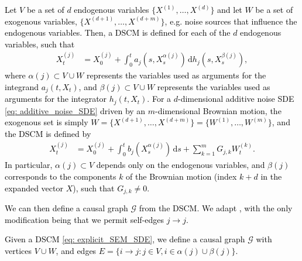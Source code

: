 \documentclass[twoside,11pt]{article}
\newcommand{\rv}[1]{\textcolor{black}{#1}}
\begin{document}
\rv{\begin{definition}[DSCM]
Let $V$ be a set of $d$ endogenous variables $\{ X^{(1)}, \dots, X^{(d)}\}$ and let $W$ be a set of exogenous variables, $\{ X^{(d+1)},\dots, X^{(d+m)}\}$, e.g. noise sources that influence the endogenous variables. Then, a DSCM is defined for each of the $d$ endogenous variables, such that 
\begin{align}
    X_t^{(j)} &= X_0^{(j)} + \int_0^t a_j(s, X^{\alpha(j)}_s) \, \mathrm{d}h_j(s, X^{\beta(j)}_s),
    \label{eq: explicit_SEM_SDE}
\end{align}
where $\alpha(j)\subset V \cup W$ represents the variables used as arguments for the integrand $a_j(t, X_t)$, and $\beta(j) \subset V \cup W$ represents the variables used as arguments for the integrator $h_j(t, X_t)$. For a $d$-dimensional additive noise SDE \eqref{eq: additive_noise_SDE} driven by an $m$-dimensional Brownian motion, the exogenous set is simply $W=\{X^{(d+1)}, \dots, X^{(d+m)}\}=\{W^{(1)}, \dots, W^{(m)}\}$, and the DSCM is defined by
\begin{align}
    X_t^{(j)}&= X_0^{(j)} + \int_0^t b_j(X^{\alpha(j)}_s) \, \mathrm{d}s +  \sum_{k=1}^{m} G_{j, k}W_t^{(k)}.
    \label{eq: DSCM_additive_SDE}
\end{align}
In particular, $\alpha(j)\subset V$ depends only on the endogenous variables, and $\beta(j)$ corresponds to the components $k$ of the Brownian motion (index $k+d$ in the expanded vector $X$), such that $G_{j,k} \neq 0$.
\end{definition}}
\rv{We can then define a causal graph $\mathcal{G}$ from the DSCM. We adapt \citep[Definition 2]{boeken2024dynamic}, with the only modification being that we permit self-edges $j \to j$.}
\rv{\begin{definition}
Given a DSCM \eqref{eq: explicit_SEM_SDE}, we define a causal graph $\mathcal{G}$ with vertices $V \cup W$, and edges $E = \{i \to j: j \in V, i \in \alpha(j) \cup \beta(j) \}$.
\end{definition}}
\end{document}
